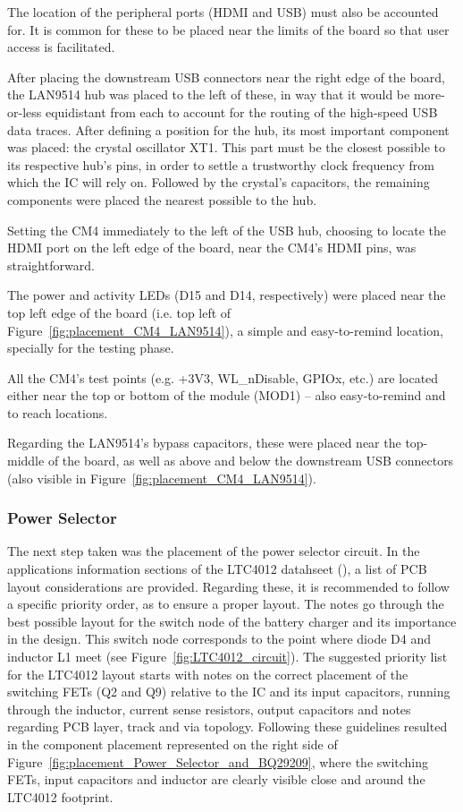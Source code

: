 The location of the peripheral ports (HDMI and USB) must also be accounted for. It is common for these to be placed near the limits of the board so that user access is facilitated.

After placing the downstream USB connectors near the right edge of the board, the LAN9514 hub was placed to the left of these, in way that it would be more-or-less equidistant from each to account for the routing of the high-speed USB data traces. After defining a position for the hub, its most important component was placed: the crystal oscillator XT1. This part must be the closest possible to its respective hub's pins, in order to settle a trustworthy clock frequency from which the IC will rely on. Followed by the crystal's capacitors, the remaining components were placed the nearest possible to the hub.

Setting the CM4 immediately to the left of the USB hub, choosing to locate the HDMI port on the left edge of the board, near the CM4's HDMI pins, was straightforward.

The power and activity LEDs (D15 and D14, respectively) were placed near the top left edge of the board (i.e. top left of Figure~\ref{fig:placement_CM4_LAN9514}), a simple and easy-to-remind location, specially for the testing phase.

All the CM4's test points (e.g. +3V3, WL\_nDisable, GPIOx, etc.) are located either near the top or bottom of the module (MOD1) -- also easy-to-remind and to reach locations.

Regarding the LAN9514's bypass capacitors, these were placed near the top-middle of the board, as well as above and below the downstream USB connectors (also visible in Figure~\ref{fig:placement_CM4_LAN9514}).


\subsubsection{Power Selector}\label{sec:5112_LAN9514}

The next step taken was the placement of the power selector circuit. In the applications information sections of the LTC4012 datahseet (\cite{LTC4012}), a list of PCB layout considerations are provided. Regarding these, it is recommended to follow a specific priority order, as to ensure a proper layout. The notes go through the best possible layout for the switch node of the battery charger and its importance in the design. This switch node corresponds to the point where diode D4 and inductor L1 meet (see Figure~\ref{fig:LTC4012_circuit}). The suggested priority list for the LTC4012 layout starts with notes on the correct placement of the switching FETs (Q2 and Q9) relative to the IC and its input capacitors, running through the inductor, current sense resistors, output capacitors and notes regarding PCB layer, track and via topology. Following these guidelines resulted in the component placement represented on the right side of Figure~\ref{fig:placement_Power_Selector_and_BQ29209}, where the switching FETs, input capacitors and inductor are clearly visible close and around the LTC4012 footprint.

